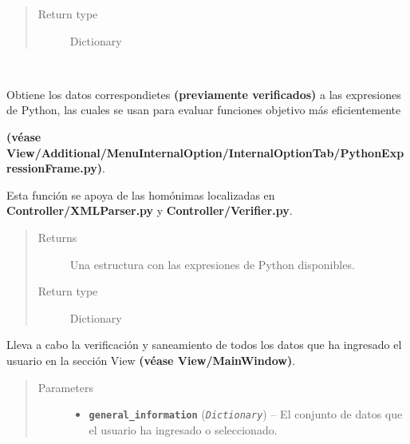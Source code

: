 \documentclass[letterpaper,10pt,english]{sphinxmanual}
\begin{document}
\begin{fulllineitems}
\begin{fulllineitems}
\begin{quote}
\begin{description}
\item[{Return type}] \leavevmode
Dictionary

\end{description}\end{quote}

\end{fulllineitems}


\begin{fulllineitems}
\label{Controller/ControllerClass:Controller.Controller.Controller.load_python_expressions}~
\begin{DUlineblock}{0em}
\item[] Obtiene los datos correspondietes \textbf{(previamente verificados)}
a las expresiones de Python, las cuales se usan para evaluar 
funciones objetivo más eficientemente
\item[] \textbf{(véase View/Additional/MenuInternalOption/InternalOptionTab/PythonExpressionFrame.py)}.
\item[] Esta función se apoya de las homónimas localizadas en 
\textbf{Controller/XMLParser.py} y \textbf{Controller/Verifier.py}.
\end{DUlineblock}
\begin{quote}\begin{description}
\item[{Returns}] \leavevmode
Una estructura con las expresiones de Python disponibles.

\item[{Return type}] \leavevmode
Dictionary

\end{description}\end{quote}

\end{fulllineitems}


\begin{fulllineitems}
\label{Controller/ControllerClass:Controller.Controller.Controller.sanitize_settings}
Lleva a cabo la verificación y saneamiento de todos los datos
que ha ingresado el usuario en la sección View \textbf{(véase View/MainWindow)}.
\begin{quote}\begin{description}
\item[{Parameters}] \leavevmode\begin{itemize}
\item {} 
\textbf{\texttt{general\_information}} (\emph{\texttt{Dictionary}}) -- El conjunto de datos que el usuario ha ingresado o
seleccionado.


\end{itemize}
\end{description}
\end{quote}
\end{fulllineitems}
\end{fulllineitems}
\end{document}
